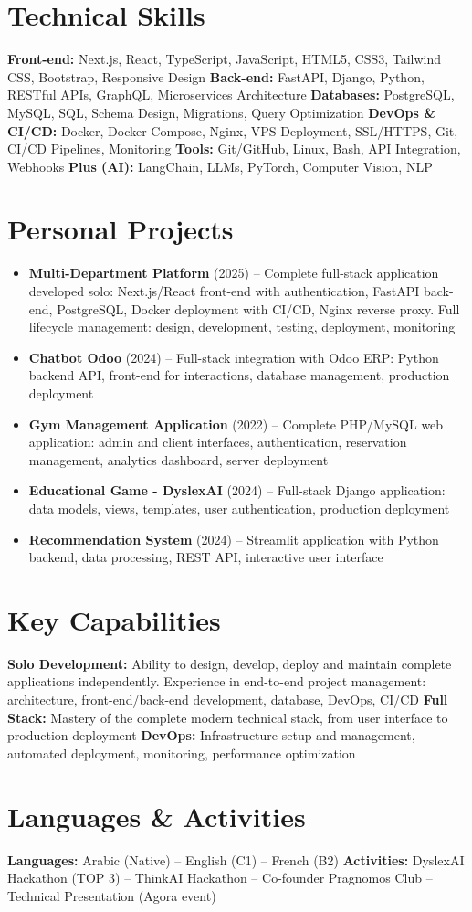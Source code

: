 \documentclass[10pt,a4paper]{article}
\begin{document}
\section*{Technical Skills}
\textbf{Front-end:} Next.js, React, TypeScript, JavaScript, HTML5, CSS3, Tailwind CSS, Bootstrap, Responsive Design \quad
\textbf{Back-end:} FastAPI, Django, Python, RESTful APIs, GraphQL, Microservices Architecture \quad
\textbf{Databases:} PostgreSQL, MySQL, SQL, Schema Design, Migrations, Query Optimization \quad
\textbf{DevOps \& CI/CD:} Docker, Docker Compose, Nginx, VPS Deployment, SSL/HTTPS, Git, CI/CD Pipelines, Monitoring \quad
\textbf{Tools:} Git/GitHub, Linux, Bash, API Integration, Webhooks \quad
\textbf{Plus (AI):} LangChain, LLMs, PyTorch, Computer Vision, NLP

\section*{Personal Projects}
\begin{itemize}
    \item \textbf{Multi-Department Platform} (2025) -- Complete full-stack application developed solo: Next.js/React front-end with authentication, FastAPI back-end, PostgreSQL, Docker deployment with CI/CD, Nginx reverse proxy. Full lifecycle management: design, development, testing, deployment, monitoring
    \item \textbf{Chatbot Odoo} (2024) -- Full-stack integration with Odoo ERP: Python backend API, front-end for interactions, database management, production deployment
    \item \textbf{Gym Management Application} (2022) -- Complete PHP/MySQL web application: admin and client interfaces, authentication, reservation management, analytics dashboard, server deployment
    \item \textbf{Educational Game - DyslexAI} (2024) -- Full-stack Django application: data models, views, templates, user authentication, production deployment
    \item \textbf{Recommendation System} (2024) -- Streamlit application with Python backend, data processing, REST API, interactive user interface
\end{itemize}

\section*{Key Capabilities}
\textbf{Solo Development:} Ability to design, develop, deploy and maintain complete applications independently. Experience in end-to-end project management: architecture, front-end/back-end development, database, DevOps, CI/CD \quad
\textbf{Full Stack:} Mastery of the complete modern technical stack, from user interface to production deployment \quad
\textbf{DevOps:} Infrastructure setup and management, automated deployment, monitoring, performance optimization

\section*{Languages \& Activities}
\textbf{Languages:} Arabic (Native) -- English (C1) -- French (B2) \quad
\textbf{Activities:} DyslexAI Hackathon (TOP 3) -- ThinkAI Hackathon -- Co-founder Pragnomos Club -- Technical Presentation (Agora event)
\end{document}
